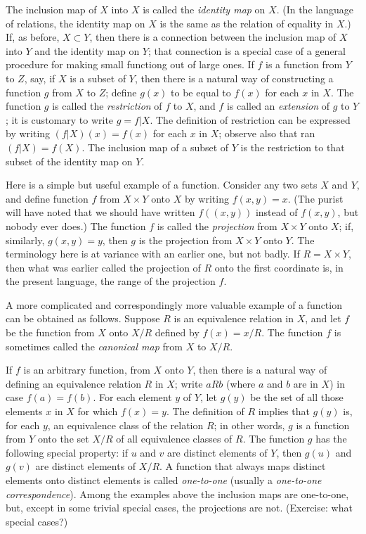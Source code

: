 The inclusion map of $X$ into $X$ is called the \textit{identity map} on $X$. (In the language of relations, the identity map on $X$ is the same as the relation of equality in $X$.) If, as before, $X \subset Y$, then there is a connection between the inclusion map of $X$ into $Y$ and the identity map on $Y$; that connection is a special case of a general procedure for making small functiong out of large ones. If $f$ is a function from $Y$ to $Z$, say, if $X$ is a subset of $Y$, then there is a natural way of constructing a function $g$ from $X$ to $Z$; define $g(x)$ to be equal to $f(x)$ for each $x$ in $X$. The function $g$ is called the \textit{restriction} of $f$ to $X$, and $f$ is called an \textit{extension} of $g$ to $Y$; it is customary to write $g = f|X$. The definition of restriction can be expressed by writing $(f|X)(x) = f(x)$ for each $x$ in $X$; observe also that ran $(f|X) = f(X)$. The inclusion map of a subset of $Y$ is the restriction to that subset of the identity map on $Y$. 

Here is a simple but useful example of a function. Consider any two sets $X$ and $Y$, and define function $f$ from $X \times Y$ onto $X$ by writing $f(x,y) = x$. (The purist  will have noted that we should have written $f((x, y))$ instead of $f(x, y)$, but nobody ever does.) The function $f$ is called the \textit{projection} from $X \times Y$ onto $X$; if, similarly, $g(x, y) = y$, then $g$ is the projection from $X \times Y$ onto $Y$. The terminology here is at variance with an earlier one, but not badly. If $R = X \times Y$, then what was earlier called the projection of $R$ onto the first coordinate is, in the present language, the range of the projection $f$.

A more complicated and correspondingly more valuable example of a function can be obtained as follows. Suppose $R$ is an equivalence relation in $X$, and let $f$ be the function from $X$ onto $X/R$ defined by $f(x) = x/R$. The function $f$ is sometimes called the \textit{canonical map} from $X$ to $X/R$.

If $f$ is an arbitrary function, from $X$ onto $Y$, then there is a natural way of defining an equivalence relation $R$ in $X$; write $a R b$ (where $a$ and $b$ are in $X$) in case $f(a) = f(b)$. For each element $y$ of $Y$, let $g(y)$ be the set of all those elements $x$ in $X$ for which $f(x) = y$. The definition of $R$ implies that $g(y)$ is, for each $y$, an equivalence class of the relation $R$; in other words, $g$ is a function from $Y$ onto the set $X/R$ of all equivalence classes of $R$. The function $g$ has the following special property: if $u$ and $v$ are distinct elements of $Y$, then $g(u)$ and $g(v)$ are distinct elements of $X/R$. A function that always maps distinct elements onto distinct elements is called \textit{one-to-one} (usually a \textit{one-to-one correspondence}). Among the examples above the inclusion maps are one-to-one, but, except in some trivial special cases, the projections are not. (Exercise: what special cases?)

